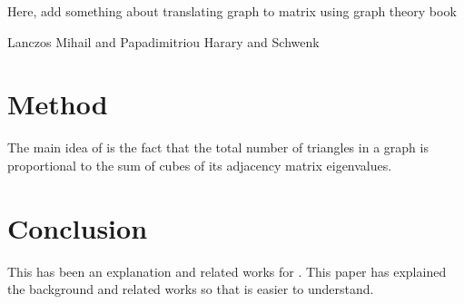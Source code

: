 \documentclass{acm_proc_article-sp}
\begin{document}
Here, add something about translating graph to matrix using graph theory book

Lanczos
Mihail and Papadimitriou
Harary and Schwenk

\section{Method}
The main idea of \cite{original} is the fact that the total number of triangles
in a graph is proportional to the sum of cubes of its adjacency matrix
eigenvalues.

\section{Conclusion}
This has been an explanation and related works for \cite{original}. This paper
has explained the background and related works so that \cite{original} is
easier to understand.

%

%
%
\end{document}
